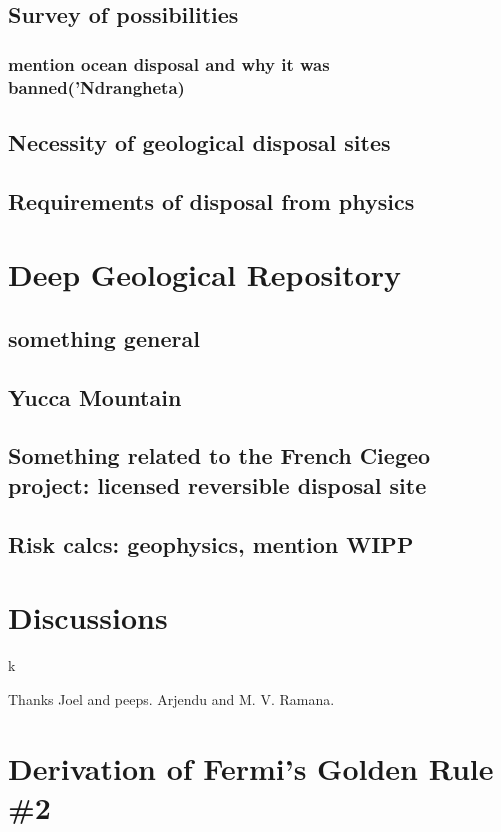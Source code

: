 \documentclass[preprint,aip,pra]{revtex4-1}
\begin{document}
    \subsection{Survey of possibilities}
    \subsubsection{mention ocean disposal and why it was banned('Ndrangheta)}
    \subsection{Necessity of geological disposal sites}
    \subsection{Requirements of disposal from physics}

\section{Deep Geological Repository}
    \subsection{something general}
    \subsection{Yucca Mountain}
    \subsection{Something related to the French Ciegeo project: licensed reversible disposal site}
    \subsection{Risk calcs: geophysics, mention WIPP}
        

\section{Discussions}

k
\begin{acknowledgments}
Thanks Joel and peeps. Arjendu and M. V. Ramana.
\end{acknowledgments}

\pagebreak


\appendix
\section{Derivation of Fermi's Golden Rule \#2}
\label{a:fermi}
\end{document}
